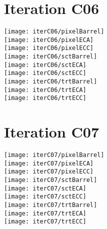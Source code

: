 \documentclass[10pt]{article}
\begin{document}
\vspace{10pt}
\section{Iteration C06}

\begin{centering}


\texttt{[image: iterC06/pixelBarrel]}\\
\texttt{[image: iterC06/pixelECA]}\\
\texttt{[image: iterC06/pixelECC]}\\

\texttt{[image: iterC06/sctBarrel]}\\
\texttt{[image: iterC06/sctECA]}\\
\texttt{[image: iterC06/sctECC]}\\

\texttt{[image: iterC06/trtBarrel]}\\
\texttt{[image: iterC06/trtECA]}\\
\texttt{[image: iterC06/trtECC]}\\

\end{centering}

\vspace{10pt}
\section{Iteration C07}

\begin{centering}


\texttt{[image: iterC07/pixelBarrel]}\\
\texttt{[image: iterC07/pixelECA]}\\
\texttt{[image: iterC07/pixelECC]}\\

\texttt{[image: iterC07/sctBarrel]}\\
\texttt{[image: iterC07/sctECA]}\\
\texttt{[image: iterC07/sctECC]}\\

\texttt{[image: iterC07/trtBarrel]}\\
\texttt{[image: iterC07/trtECA]}\\
\texttt{[image: iterC07/trtECC]}\\

\end{centering}
\vspace{10pt}
\end{document}
